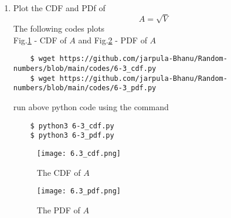\documentclass[journal,12pt,twocolumn]{IEEEtran}
\renewcommand\thesection{\arabic{section}}
\begin{document}
\begin{enumerate}[label=\thesection.\arabic*
,ref=\thesection.\theenumi]
%
\item
\label{ch3_raleigh_sim}
Plot the CDF and PDf of
%
\begin{equation}
A = \sqrt{V}
\end{equation}
%
\solution The following codes plots\\
 Fig.\ref{fig:6.3_cdf} - CDF of $A$ and Fig.\ref{fig:6.3_pdf} - PDF of $A$
\begin{lstlisting}
    $ wget https://github.com/jarpula-Bhanu/Random-numbers/blob/main/codes/6-3_cdf.py
    $ wget https://github.com/jarpula-Bhanu/Random-numbers/blob/main/codes/6-3_pdf.py
\end{lstlisting}
run above python code using the command
\begin{lstlisting}
    $ python3 6-3_cdf.py
    $ python3 6-3_pdf.py
\end{lstlisting}
\begin{figure}[h]
    \centering
    \texttt{[image: 6.3\_cdf.png]}
    \caption{The CDF of $A$}
    \label{fig:6.3_cdf}
\end{figure}
\begin{figure}[h]
    \centering
    \texttt{[image: 6.3\_pdf.png]}
    \caption{The PDF of $A$}
    \label{fig:6.3_pdf}
\end{figure}


\end{enumerate}
\end{document}
